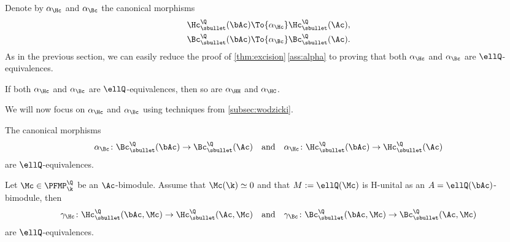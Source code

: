 Denote by $\alpha_\Hc$ and $\alpha_\Bc$ the canonical morphisms
\begin{align*}
\Hc_\sbullet^\Q(\bAc) &\To{\alpha_\Hc} \Hc_\sbullet^\Q(\Ac), \\
\Bc_\sbullet^\Q(\bAc) &\To{\alpha_\Bc} \Bc_\sbullet^\Q(\Ac).
\end{align*}
As in the previous section, we can easily reduce the proof of \autoref{thm:excision}\,\eqref{ass:alpha} to proving that both $\alpha_\Hc$ and $\alpha_\Bc$ are $\ellQ$-equivalences.

\begin{lem}
If both $\alpha_\Hc$ and $\alpha_\Bc$ are $\ellQ$-equivalences, then so are $\alpha_\HH$ and $\alpha_\HC$.
\end{lem}

We will now focus on $\alpha_\Hc$ and $\alpha_\Bc$ using techniques from \autoref{subsec:wodzicki}.

\begin{prop}\label{prop:alphaelleq}
The canonical morphisms
\[
\alpha_\Bc \colon \Bc_\sbullet^\Q(\bAc) \to \Bc_\sbullet^\Q(\Ac) \quad \text{and} \quad \alpha_\Hc \colon \Hc_\sbullet^\Q(\bAc) \to \Hc_\sbullet^\Q(\Ac)
\]
are $\ellQ$-equivalences.
\end{prop}

\begin{lem}\label{lem:gammaeqs}
Let $\Mc \in \PFMP_\k^\Q$ be an $\Ac$-bimodule.
Assume that $\Mc(\k) \simeq 0$ and that $M:= \ellQ(\Mc)$ is H-unital as an $A = \ellQ(\bAc)$-bimodule, then
\[
\gamma_\Hc \colon \Hc_\sbullet^\Q(\bAc,\Mc) \to \Hc_\sbullet^\Q(\Ac, \Mc) \quad \text{and} \quad
\gamma_\Bc\colon\Bc_\sbullet^\Q(\bAc,\Mc) \to \Bc_\sbullet^\Q(\Ac, \Mc)
\]
are $\ellQ$-equivalences.
\end{lem}

